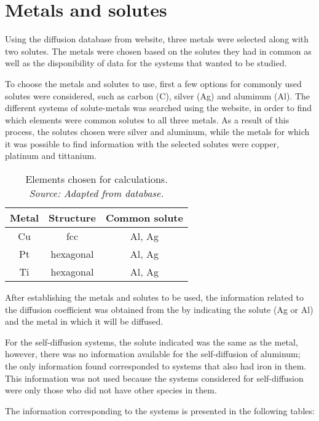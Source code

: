 \section{Metals and solutes}

Using the diffusion database from \citet{kakusan} website, three metals were selected along with two solutes. The metals were chosen based on the solutes they had in common as well as the disponibility of data for the systems that wanted to be studied.

To choose the metals and solutes to use, first a few options for commonly used solutes were considered, such as carbon (C), silver (Ag) and aluminum (Al). The different systems of solute-metals was searched using the \cite{kakusan} website, in order to find which elements were common solutes to all three metals. As a result of this process, the solutes chosen were silver and aluminum, while the metals for which it was possible to find information with the selected solutes were copper, platinum and tittanium.

\begin{table}[H]
    \centering
    \begin{tabular}{ccc}
        Metal & Structure & Common solute\\ \hline \hline
        Cu & fcc & Al, Ag \\
        Pt & hexagonal & Al, Ag \\
        Ti & hexagonal & Al, Ag \\
    \end{tabular}
    \caption{Elements chosen for calculations. \\ 
    \textit{Source: Adapted from \citep{kakusan} database.}}
    \label{tab:tabla1}
\end{table}

After establishing the metals and solutes to be used, the information related to the diffusion coefficient was obtained from the \citet{kakusan} by indicating the solute (Ag or Al) and the metal in which it will be diffused.

For the self-diffusion systems, the solute indicated was the same as the metal, however, there was no information available for the self-diffusion of aluminum; the only information found corresponded to systems that also had iron in them. This information was not used because the systems considered for self-diffusion were only those who did not have other species in them.

\newpage
The information corresponding to the systems is presented in the following tables:

